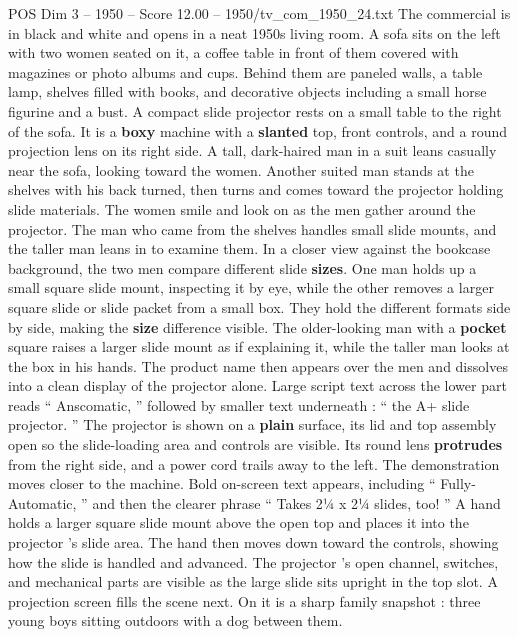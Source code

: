 \begin{textsample}{POS Dim 3 – 1950 – Score 12.00 – 1950/tv\_com\_1950\_24.txt}  \label{ex:f3_pos_014}
The commercial is in black and white and opens in a neat 1950s living room.
A sofa sits on the left with two women seated on it, a coffee table in front of them covered with magazines or photo albums and cups.
Behind them are paneled walls, a table lamp, shelves filled with books, and decorative objects including a small horse figurine and a bust.
A compact slide projector rests on a small table to the right of the sofa.
It is a \textbf{boxy} machine with a \textbf{slanted} top, front controls, and a round projection lens on its right side.
A tall, dark-haired man in a suit leans casually near the sofa, looking toward the women.
Another suited man stands at the shelves with his back turned, then turns and comes toward the projector holding slide materials.
The women smile and look on as the men gather around the projector.
The man who came from the shelves handles small slide mounts, and the taller man leans in to examine them.
In a closer view against the bookcase background, the two men compare different slide \textbf{sizes}.
One man holds up a small square slide mount, inspecting it by eye, while the other removes a larger square slide or slide packet from a small box.
They hold the different formats side by side, making the \textbf{size} difference visible.
The older-looking man with a \textbf{pocket} square raises a larger slide mount as if explaining it, while the taller man looks at the box in his hands.
The product name then appears over the men and dissolves into a clean display of the projector alone.
Large script text across the lower part reads “ Anscomatic, ” followed by smaller text underneath : “ the A+ slide projector. ” The projector is shown on a \textbf{plain} surface, its lid and top assembly open so the slide-loading area and controls are visible.
Its round lens \textbf{protrudes} from the right side, and a power cord trails away to the left.
The demonstration moves closer to the machine.
Bold on-screen text appears, including “ Fully-Automatic, ” and then the clearer phrase “ Takes 2¼ x 2¼ slides, too! ” A hand holds a larger square slide mount above the open top and places it into the projector ’s slide area.
The hand then moves down toward the controls, showing how the slide is handled and advanced.
The projector ’s open channel, switches, and mechanical parts are visible as the large slide sits upright in the top slot.
A projection screen fills the scene next.
On it is a sharp family snapshot : three young boys sitting outdoors with a dog between them.

\end{textsample}
